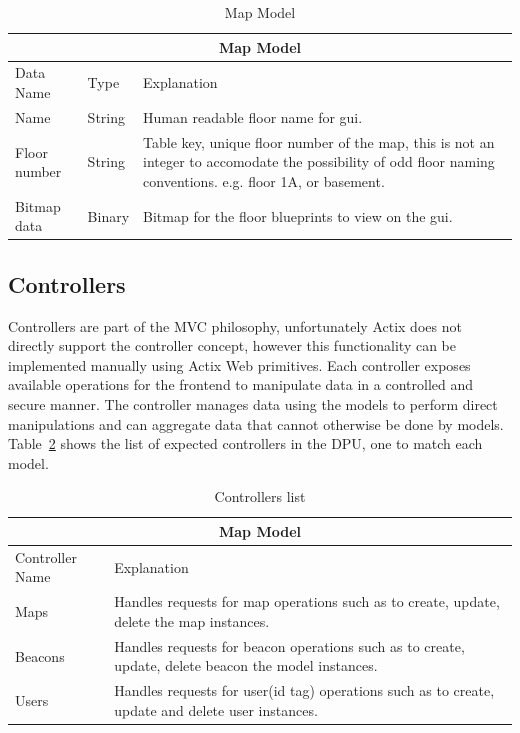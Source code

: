 \begin{table}[H]
\centering
\begin{tabular}{| m{3cm} | m{3cm} | m{9.5cm} |}
	\hline
	\multicolumn{3}{|c|}{Map Model} \\

	\hline
	Data Name & Type & Explanation \\
	\hline
	Name & String & Human readable floor name for gui. \\
	\hline
	Floor number & String & Table key, unique floor number of the map, this is not an integer to accomodate the possibility of odd floor naming conventions. e.g. floor 1A, or basement. \\
	\hline
	Bitmap data & Binary & Bitmap for the floor blueprints to view on the gui. \\
	\hline
\end{tabular}
\caption{Map Model}
\label{map_model}
\end{table}


\pagebreak
\subsection{Controllers}
\medskip
Controllers are part of the MVC philosophy, unfortunately Actix does not directly support the controller concept, however this functionality can be implemented manually using Actix Web primitives.
Each controller exposes available operations for the frontend to manipulate data in a controlled and secure manner.
The controller manages data using the models to perform direct manipulations and can aggregate data that cannot otherwise be done by models.
Table~\ref{controllers_table} shows the list of expected controllers in the DPU, one to match each model.

\begin{table}[H]
\centering
\begin{tabular}{| m{3cm} | m{9.5cm} |}
	\hline
	\multicolumn{2}{|c|}{Map Model} \\
	\hline
	Controller Name & Explanation \\
	\hline
	Maps & Handles requests for map operations such as to create, update, delete the map instances. \\
	\hline
	Beacons & Handles requests for beacon operations such as to create, update, delete beacon the model instances. \\
	\hline
	Users & Handles requests for user(id tag) operations such as to create, update and delete user instances. \\
	\hline
\end{tabular}
\caption{Controllers list}
\label{controllers_table}
\end{table}

